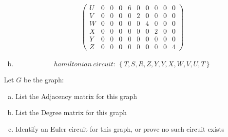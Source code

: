 \documentclass[10pt,letterpaper, cm]{hmcpset}
\begin{document}
\begin{enumerate}[(a)]
\begin{align*}
\begin{pmatrix}
         U   & 0 & 0 & 0 & 6 & 0 & 0 & 0 & 0 & 0  \\

         V   & 0 & 0 & 0 & 0 & 2 & 0 & 0 & 0 & 0 \\

         W   & 0 & 0 & 0 & 0 & 0 & 4 & 0 & 0 & 0 \\

         X   & 0 & 0 & 0 & 0 & 0 & 0 & 2 & 0 & 0 \\

         Y   & 0 & 0 & 0 & 0 & 0 & 0 & 0 & 0 & 0 \\

         Z   & 0 & 0 & 0 & 0 & 0 & 0 & 0 & 0 & 4

      \end{pmatrix}  
              \end{align*}

  \item
    \begin{equation*}
      hamiltonian~circuit:~\left\{T, S, R, Z, Y, Y, X, W, V, U, T\right\}
    \end{equation*}
\end{enumerate}
\begin{problem}[10]
    Let $G$ be the graph:
    \begin{center}
    \end{center}

    \begin{enumerate}[(a)]
        \item List the Adjacency matrix for this graph
        \item List the Degree matrix for this graph
        \item Identify an Euler circuit for this graph, or prove no such circuit exists
    \end{enumerate}
\end{problem}
\end{document}
